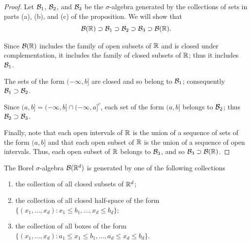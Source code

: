 \begin{proof}
 Let $\mathcal{B}_1$, $\mathcal{B}_2$, and $\mathcal{B}_3$ be the $\sigma$-algebra generated by the collections of sets in parts (a), (b), and (c) of the proposition. We will show that
 $$\mathcal{B}(\mathbb{R})\supset \mathcal{B}_1 \supset \mathcal{B}_2 \supset \mathcal{B}_3 \supset \mathcal{B}(\mathbb{R}).$$

 Since $\mathcal{B}(\mathbb{R})$ includes the family of open subsets of $\mathbb{R}$ and is closed under complementation, it includes the family of closed subsets of $\mathbb{R}$; thus it includes $\mathcal{B}_1$.

 The sets of the form $(-\infty,b]$ are closed and so belong to $\mathcal{B}_1$; consequently $\mathcal{B}_1 \supset \mathcal{B}_2$.

 Since $(a,b]=(-\infty,b]\cap(-\infty,a]^c$, each set of the form
 $(a,b]$ belongs to $\mathcal{B}_2$; thus $\mathcal{B}_2 \supset \mathcal{B}_3$.

 Finally, note that each open intervals of $\mathbb{R}$ is the union of a sequence of sets of the form $(a,b]$ and that each open subset of $\mathbb{R}$ is the union of a sequence of open intervals. Thus, each open subset of $\mathbb{R}$ belongs to $\mathcal{B}_3$, and so $\mathcal{B}_3 \supset \mathcal{B}(\mathbb{R})$.
\end{proof}

\begin{proposition}
 The Borel $\sigma$-algebra $\mathcal{B}(\mathbb{R}^d)$ is generated by one of the following collections
 \begin{enumerate}[label=(\alph*)]
  \item the collection of all closed subsets of $\mathbb{R}^d$;
  \item the collection of all closed half-space of the form $\{(x_1,\ldots,x_d): x_1\le b_1,\ldots, x_d\le b_d\}$;
  \item the collection of all boxes of the form $\{(x_1,\ldots,x_d): a_1\le x_1\le b_1,\ldots,a_d\le x_d\le b_d\}$.
 \end{enumerate}
\end{proposition}



